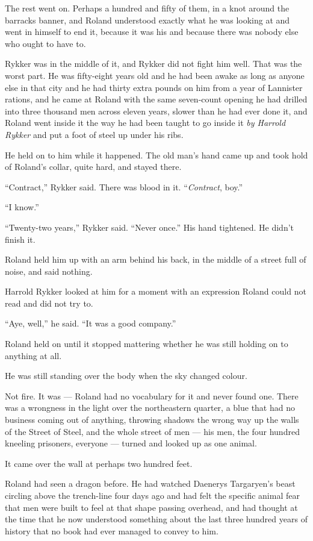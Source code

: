 The rest went on. Perhaps a hundred and fifty of them, in a knot around the barracks banner, and Roland understood exactly what he was looking at and went in himself to end it, because it was his and because there was nobody else who ought to have to.

Rykker was in the middle of it, and Rykker did not fight him well. That was the worst part. He was fifty-eight years old and he had been awake as long as anyone else in that city and he had thirty extra pounds on him from a year of Lannister rations, and he came at Roland with the same seven-count opening he had drilled into three thousand men across eleven years, slower than he had ever done it, and Roland went inside it the way he had been taught to go inside it \textit{by Harrold Rykker} and put a foot of steel up under his ribs.

He held on to him while it happened. The old man’s hand came up and took hold of Roland’s collar, quite hard, and stayed there.

“Contract,” Rykker said. There was blood in it. “\textit{Contract}, boy.”

“I know.”

“Twenty-two years,” Rykker said. “Never once.” His hand tightened. He didn’t finish it.

Roland held him up with an arm behind his back, in the middle of a street full of noise, and said nothing.

Harrold Rykker looked at him for a moment with an expression Roland could not read and did not try to.

“Aye, well,” he said. “It was a good company.”

Roland held on until it stopped mattering whether he was still holding on to anything at all.

\sceneBreak

He was still standing over the body when the sky changed colour.

Not fire. It was — Roland had no vocabulary for it and never found one. There was a wrongness in the light over the northeastern quarter, a blue that had no business coming out of anything, throwing shadows the wrong way up the walls of the Street of Steel, and the whole street of men — his men, the four hundred kneeling prisoners, everyone — turned and looked up as one animal.

It came over the wall at perhaps two hundred feet.

Roland had seen a dragon before. He had watched Daenerys Targaryen’s beast circling above the trench-line four days ago and had felt the specific animal fear that men were built to feel at that shape passing overhead, and had thought at the time that he now understood something about the last three hundred years of history that no book had ever managed to convey to him.

